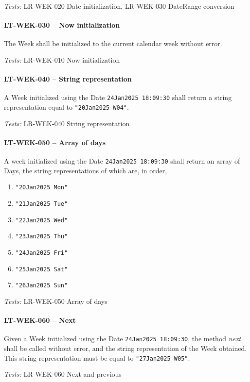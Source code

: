 \textit{Tests: } LR-WEK-020 Date initialization, LR-WEK-030 DateRange conversion

\paragraph{LT-WEK-030 -- Now initialization}
The Week shall be initialized to the current calendar week without error.

\textit{Tests: } LR-WEK-010 Now initialization

\paragraph{LT-WEK-040 -- String representation}
A Week initialized using the Date \lstinline{24Jan2025 18:09:30} shall
return a string representation equal to \lstinline{"20Jan2025 W04"}.

\textit{Tests: } LR-WEK-040 String representation

\paragraph{LT-WEK-050 -- Array of days}
A week initialized using the Date \lstinline{24Jan2025 18:09:30} shall
return an array of Days, the string representations of which are,
in order,
\begin{enumerate}
\item \lstinline{"20Jan2025 Mon"}
\item \lstinline{"21Jan2025 Tue"}
\item \lstinline{"22Jan2025 Wed"}
\item \lstinline{"23Jan2025 Thu"}
\item \lstinline{"24Jan2025 Fri"}
\item \lstinline{"25Jan2025 Sat"}
\item \lstinline{"26Jan2025 Sun"}
\end{enumerate}

\textit{Tests: } LR-WEK-050 Array of days

\paragraph{LT-WEK-060 -- Next}
Given a Week initialized using the Date \lstinline{24Jan2025 18:09:30},
the method \emph{next} shall be called without error, and
the string representation of the Week obtained.
This string representation must be equal to \lstinline{"27Jan2025 W05"}.

\textit{Tests: } LR-WEK-060 Next and previous

